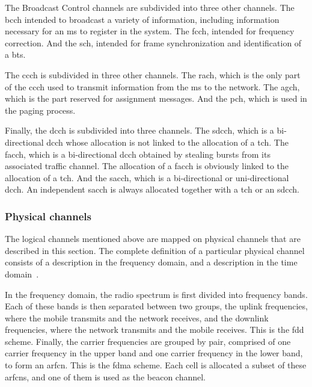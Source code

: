      The Broadcast Control channels are subdivided into three other
      channels. The \gls{bcch} intended to broadcast a variety of
      information, including information necessary for an \gls{ms} to
      register in the system. The \gls{fcch}, intended for frequency
      correction. And the \gls{sch}, intended for frame synchronization
      and identification of a \gls{bts}.

      The \gls{ccch} is subdivided in three other channels. The
      \gls{rach}, which is the only part of the \gls{ccch} used to
      transmit information from the \gls{ms} to the network. The
      \gls{agch}, which is the part reserved for assignment messages.
      And the \gls{pch}, which is used in the paging process.

      Finally, the \gls{dcch} is subdivided into three channels. The
      \gls{sdcch}, which is a bi-directional \gls{dcch} whose allocation
      is not linked to the allocation of a \gls{tch}. The \gls{facch},
      which is a bi-directional \gls{dcch} obtained by stealing bursts
      from its associated traffic channel. The allocation of a
      \gls{facch} is obviously linked to the allocation of a \gls{tch}.
      And the \gls{sacch}, which is a bi-directional or uni-directional
      \gls{dcch}. An independent \gls{sacch} is always allocated
      together with a \gls{tch} or an \gls{sdcch}.

    \subsubsection{Physical channels}


      The logical channels mentioned above are mapped on physical
      channels that are described in this section. The complete
      definition of a particular physical channel consists of a
      description in the frequency domain, and a description in the time
      domain~\cite{3gpp_ts_2015-3,3gpp_ts_2015-4}.

      In the frequency domain, the radio spectrum is first divided into
      frequency bands. Each of these bands is then separated between two
      groups, the uplink frequencies, where the mobile transmits and the
      network receives, and the downlink frequencies, where the network
      transmits and the mobile receives. This is the \gls{fdd} scheme.
      Finally, the carrier frequencies are grouped by pair, comprised of
      one carrier frequency in the upper band and one carrier frequency
      in the lower band, to form an \gls{arfcn}. This is the \gls{fdma}
      scheme. Each cell is allocated a subset of these \glspl{arfcn},
      and one of them is used as the beacon channel.

